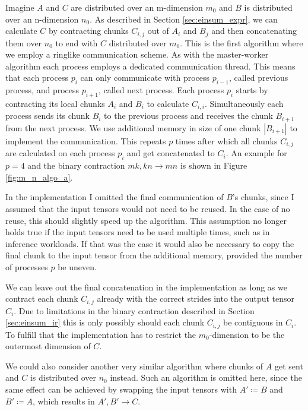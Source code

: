 Imagine $A$ and $C$ are distributed over an m-dimension $m_0$ and $B$ is distributed over an n-dimension $n_0$.
As described in Section \ref{sec:einsum_expr}, we can calculate $C$ by contracting chunks $C_{i,j}$ out of $A_i$ and $B_j$ and then concatenating them over $n_0$ to end with $C$ distributed over $m_0$.
This is the first algorithm where we employ a ringlike communication scheme.
As with the master-worker algorithm each process employs a dedicated communication thread.
This means that each process $p_i$ can only communicate with process $p_{i-1}$, called previous process, and process $p_{i+1}$, called next process.
Each process $p_i$ starts by contracting its local chunks $A_i$ and $B_i$ to calculate $C_{i,i}$.
Simultaneously each process sends its chunk $B_i$ to the previous process and receives the chunk $B_{i+1}$ from the next process.
We use additional memory in size of one chunk $|B_{i+1}|$ to implement the communication.
This repeats $p$ times after which all chunks $C_{i,j}$ are calculated on each process $p_i$ and get concatenated to $C_i$.
An example for $p=4$ and the binary contraction $mk, kn \rightarrow mn$ is shown in Figure \ref{fig:m_n_algo_a}.

In the implementation I omitted the final communication of $B$'s chunks, since I assumed that the input tensors would not need to be reused.
In the case of no reuse, this should slightly speed up the algorithm.
This assumption no longer holds true if the input tensors need to be used multiple times, such as in inference workloads.
If that was the case it would also be necessary to copy the final chunk to the input tensor from the additional memory, provided the number of processes $p$ be uneven.

We can leave out the final concatenation in the implementation as long as we contract each chunk $C_{i,j}$ already with the correct strides into the output tensor $C_i$.
Due to limitations in the binary contraction described in Section \ref{sec:einsum_ir} this is only possibly should each chunk $C_{i,j}$ be contiguous in $C_i$.
To fulfill that the implementation has to restrict the $m_0$-dimension to be the outermost dimension of $C$.

We could also consider another very similar algorithm where chunks of $A$ get sent and $C$ is distributed over $n_0$ instead.
Such an algorithm is omitted here, since the same effect can be achieved by swapping the input tensors with $A' \coloneqq B$ and $B' \coloneqq A$, which results in $A',B' \rightarrow C$.


